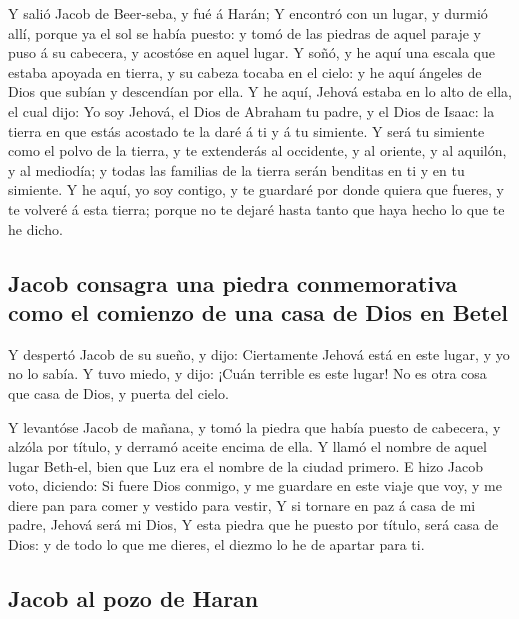  Y salió Jacob de Beer-seba, y fué á Harán;
 Y encontró con un lugar, y durmió allí, porque ya el sol
se había puesto: y tomó de las piedras de aquel paraje y puso á su
cabecera, y acostóse en aquel lugar.  Y soñó, y he aquí
una escala que estaba apoyada en tierra, y su cabeza tocaba en el cielo:
y he aquí ángeles de Dios que subían y descendían por ella.
 Y he aquí, Jehová estaba en lo alto de ella, el cual
dijo: Yo soy Jehová, el Dios de Abraham tu padre, y el Dios de Isaac: la
tierra en que estás acostado te la daré á ti y á tu simiente.
 Y será tu simiente como el polvo de la tierra, y te
extenderás al occidente, y al oriente, y al aquilón, y al mediodía; y
todas las familias de la tierra serán benditas en ti y en tu simiente.
 Y he aquí, yo soy contigo, y te guardaré por donde
quiera que fueres, y te volveré á esta tierra; porque no te dejaré hasta
tanto que haya hecho lo que te he dicho.

\hypertarget{jacob-consagra-una-piedra-conmemorativa-como-el-comienzo-de-una-casa-de-dios-en-betel}{%
\subsection{Jacob consagra una piedra conmemorativa como el comienzo de
una casa de Dios en
Betel}\label{jacob-consagra-una-piedra-conmemorativa-como-el-comienzo-de-una-casa-de-dios-en-betel}}

 Y despertó Jacob de su sueño, y dijo: Ciertamente Jehová
está en este lugar, y yo no lo sabía.  Y tuvo miedo, y
dijo: ¡Cuán terrible es este lugar! No es otra cosa que casa de Dios, y
puerta del cielo.

 Y levantóse Jacob de mañana, y tomó la piedra que había
puesto de cabecera, y alzóla por título, y derramó aceite encima de
ella.  Y llamó el nombre de aquel lugar Beth-el, bien que
Luz era el nombre de la ciudad primero.  E hizo Jacob
voto, diciendo: Si fuere Dios conmigo, y me guardare en este viaje que
voy, y me diere pan para comer y vestido para vestir,  Y
si tornare en paz á casa de mi padre, Jehová será mi Dios,
 Y esta piedra que he puesto por título, será casa de
Dios: y de todo lo que me dieres, el diezmo lo he de apartar para ti.

\hypertarget{jacob-al-pozo-de-haran}{%
\subsection{Jacob al pozo de Haran}\label{jacob-al-pozo-de-haran}}

